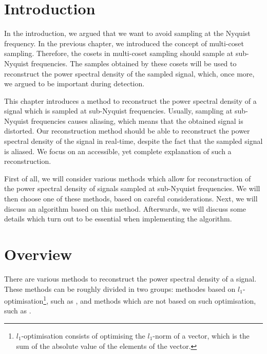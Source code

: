 \documentclass[a4paper, openany, oneside]{memoir}
\begin{document}

\section{Introduction}
In the introduction, we argued that we want to avoid sampling at the Nyquist frequency. In the previous chapter, we introduced the concept of multi-coset sampling. Therefore, the cosets in multi-coset sampling should sample at sub-Nyquist frequencies. The samples obtained by these cosets will be used to reconstruct the power spectral density of the sampled signal, which, once more, we argued to be important during detection.

This chapter introduces a method to reconstruct the power spectral density of a signal which is sampled at sub-Nyquist frequencies. Usually, sampling at sub-Nyquist frequencies causes aliasing, which means that the obtained signal is distorted. Our reconstruction method should be able to reconstruct the power spectral density of the signal in real-time, despite the fact that the sampled signal is aliased. We focus on an accessible, yet complete explanation of such a reconstruction.

First of all, we will consider various methods which allow for reconstruction of the power spectral density of signals sampled at sub-Nyquist frequencies. We will then choose one of these methods, based on careful considerations. Next, we will discuss an algorithm based on this method. Afterwards, we will discuss some details which turn out to be essential when implementing the algorithm.

\section{Overview}
There are various methods to reconstruct the power spectral density of a signal. These methods can be roughly divided in two groups: methodes based on $l_1$-optimisation\footnote{$l_1$-optimisation consists of optimising the $l_1$-norm of a vector, which is the sum of the absolute value of the elements of the vector.}, such as \cite{bayarkernel, candes2006robust, candes2007sparsity, candes2008introduction, kirolos2006analog, li2014gomp, polo2009compressive, pal2011coprime}, and methods which are not based on such optimisation, such as \cite{ariananda2011multicoset,ariananda2012compressive}.
\end{document}
